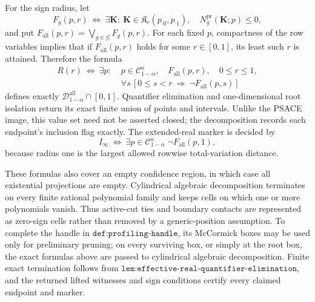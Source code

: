 For the sign radius, let
\[
 F_g(p,r)\ \Longleftrightarrow\
 \exists\mathbf K:\ \mathbf K\in\mathfrak K_r(p_{\cdot0},p_{\cdot1}),\quad
 N_g^{\mathrm{pr}}(\mathbf K;p)\le0,
\]
and put \(F_{\mathrm{all}}(p,r)=\bigvee_{g\in\mathcal G}F_g(p,r)\).  For each fixed \(p\), compactness of the row variables implies that if \(F_{\mathrm{all}}(p,r)\) holds for some \(r\in[0,1]\), its least such \(r\) is attained.  Therefore the formula
\[
\begin{split}
 R(r)\ \Longleftrightarrow\ \exists p:\;&p\in\mathcal C_{1-\alpha}^{\kappa},\quad
 F_{\mathrm{all}}(p,r),\quad 0\le r\le1,\\
 &\forall s\,[0\le s<r\ \Longrightarrow\ \neg F_{\mathrm{all}}(p,s)]
\end{split}
\]
defines exactly \(\mathcal D_{1-\alpha}^{\mathrm{all}}\cap[0,1]\).  Quantifier elimination and one-dimensional root isolation return its exact finite union of points and intervals.  Unlike the PSACE image, this value set need not be asserted closed; the decomposition records each endpoint's inclusion flag exactly.  The extended-real marker is decided by
\[
 I_\infty\ \Longleftrightarrow\
 \exists p\in\mathcal C_{1-\alpha}^{\kappa}\;
 \neg F_{\mathrm{all}}(p,1),
\]
because radius one is the largest allowed rowwise total-variation distance.

These formulas also cover an empty confidence region, in which case all existential projections are empty.  Cylindrical algebraic decomposition terminates on every finite rational polynomial family and keeps cells on which one or more polynomials vanish.  Thus active-cut ties and boundary contacts are represented as zero-sign cells rather than removed by a generic-position assumption.  To complete the handle in \(\texttt{def:profiling-handle}\), its McCormick boxes may be used only for preliminary pruning; on every surviving box, or simply at the root box, the exact formulas above are passed to cylindrical algebraic decomposition.  Finite exact termination follows from \(\texttt{lem:effective-real-quantifier-elimination}\), and the returned lifted witnesses and sign conditions certify every claimed endpoint and marker.